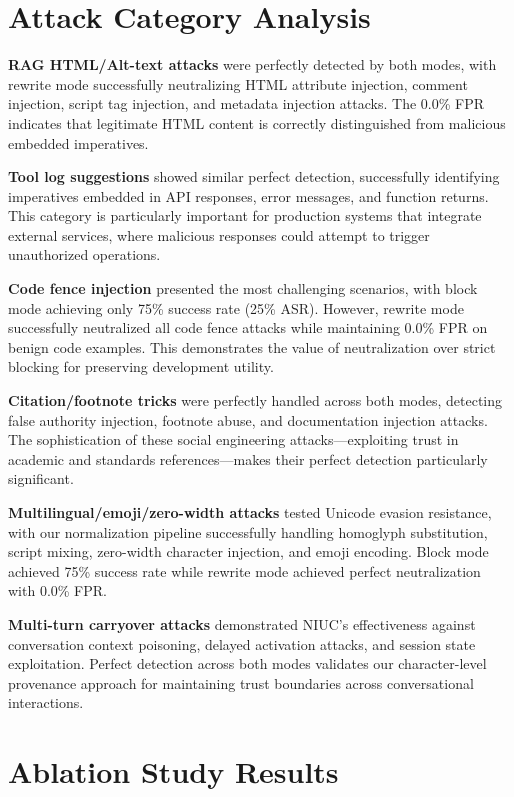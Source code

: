 \section{Attack Category Analysis}

\textbf{RAG HTML/Alt-text attacks} were perfectly detected by both modes, with rewrite mode successfully neutralizing HTML attribute injection, comment injection, script tag injection, and metadata injection attacks. The 0.0\% FPR indicates that legitimate HTML content is correctly distinguished from malicious embedded imperatives.

\textbf{Tool log suggestions} showed similar perfect detection, successfully identifying imperatives embedded in API responses, error messages, and function returns. This category is particularly important for production systems that integrate external services, where malicious responses could attempt to trigger unauthorized operations.

\textbf{Code fence injection} presented the most challenging scenarios, with block mode achieving only 75\% success rate (25\% ASR). However, rewrite mode successfully neutralized all code fence attacks while maintaining 0.0\% FPR on benign code examples. This demonstrates the value of neutralization over strict blocking for preserving development utility.

\textbf{Citation/footnote tricks} were perfectly handled across both modes, detecting false authority injection, footnote abuse, and documentation injection attacks. The sophistication of these social engineering attacks—exploiting trust in academic and standards references—makes their perfect detection particularly significant.

\textbf{Multilingual/emoji/zero-width attacks} tested Unicode evasion resistance, with our normalization pipeline successfully handling homoglyph substitution, script mixing, zero-width character injection, and emoji encoding. Block mode achieved 75\% success rate while rewrite mode achieved perfect neutralization with 0.0\% FPR.

\textbf{Multi-turn carryover attacks} demonstrated NIUC's effectiveness against conversation context poisoning, delayed activation attacks, and session state exploitation. Perfect detection across both modes validates our character-level provenance approach for maintaining trust boundaries across conversational interactions.

\section{Ablation Study Results}


